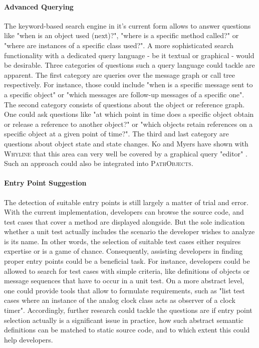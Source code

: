 \paragraph{Advanced Querying} The keyword-based search engine in it's current form allows to answer questions like "when is an object used (next)?", "where is a specific method called?" or "where are instances of a specific class used?".
A more sophisticated search functionality with a dedicated query language - be it textual or graphical - would be desirable.
Three categories of questions such a query language could tackle are apparent.
The first category are queries over the message graph or call tree respectively.
For instance, those could include "when is a specific message sent to a specific object" or "which messages are follow-up messages of a specific one".
The second category consists of questions about the object or reference graph.
One could ask questions like "at which point in time does a specific object obtain or release a reference to another object?" or "which objects retain references on a specific object at a given point of time?".
The third and last category are questions about object state and state changes.
Ko and Myers have shown with \textsc{Whyline} that this area can very well be covered by a graphical query "editor" \cite{ko_debugging_2008}.
Such an approach could also be integrated into \textsc{PathObjects}.

\paragraph{Entry Point Suggestion} The detection of suitable entry points is still largely a matter of trial and error.
With the current implementation, developers can browse the source code, and test cases that cover a method are displayed alongside.
But the sole indication whether a unit test actually includes the scenario the developer wishes to analyze is its name.
In other words, the selection of suitable test cases either requires expertise or is a game of chance.
Consequently, assisting developers in finding proper entry points could be a beneficial task.
For instance, developers could be allowed to search for test cases with simple criteria, like definitions of objects or message sequences that have to occur in a unit test.
On a more abstract level, one could provide tools that allow to formulate requirements, such as "list test cases where an instance of the analog clock class acts as observer of a clock timer".
Accordingly, further research could tackle the questions are if entry point selection actually is a significant issue in practice, how such abstract semantic definitions can be matched to static source code, and to which extent this could help developers.

